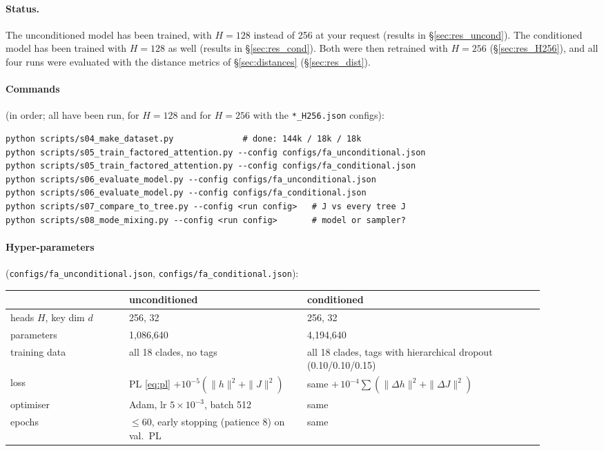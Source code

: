 \paragraph{Status.} The unconditioned model has been trained, with $H=128$ instead of 256 at your request
(results in \S\ref{sec:res_uncond}). The conditioned model has been trained with $H=128$ as well
(results in \S\ref{sec:res_cond}). Both were then retrained with $H=256$ (\S\ref{sec:res_H256}), and all four
runs were evaluated with the distance metrics of \S\ref{sec:distances} (\S\ref{sec:res_dist}).

\paragraph{Commands} (in order; all have been run, for $H=128$ and for $H=256$ with the \texttt{*\_H256.json} configs):
{\small\begin{verbatim}
python scripts/s04_make_dataset.py              # done: 144k / 18k / 18k
python scripts/s05_train_factored_attention.py --config configs/fa_unconditional.json
python scripts/s05_train_factored_attention.py --config configs/fa_conditional.json
python scripts/s06_evaluate_model.py --config configs/fa_unconditional.json
python scripts/s06_evaluate_model.py --config configs/fa_conditional.json
python scripts/s07_compare_to_tree.py --config <run config>   # J vs every tree J
python scripts/s08_mode_mixing.py --config <run config>       # model or sampler?
\end{verbatim}}

\paragraph{Hyper-parameters} (\texttt{configs/fa\_unconditional.json}, \texttt{configs/fa\_conditional.json}):
\begin{center}\small
\begin{tabular}{p{0.2\linewidth}p{0.3\linewidth}p{0.4\linewidth}}
\toprule
 & unconditioned & conditioned\\
\midrule
heads $H$, key dim $d$ & 256, 32 & 256, 32\\
parameters & 1{,}086{,}640 & 4{,}194{,}640\\
training data & all 18 clades, no tags & all 18 clades, tags with hierarchical dropout (0.10/0.10/0.15)\\
loss & PL \eqref{eq:pl} $+10^{-5}(\|h\|^2+\|J\|^2)$ & same $+\,10^{-4}\sum(\|\Delta h\|^2+\|\Delta J\|^2)$\\
optimiser & Adam, lr $5\times10^{-3}$, batch 512 & same\\
epochs & $\le60$, early stopping (patience 8) on val.\ PL & same\\
\bottomrule
\end{tabular}
\end{center}


